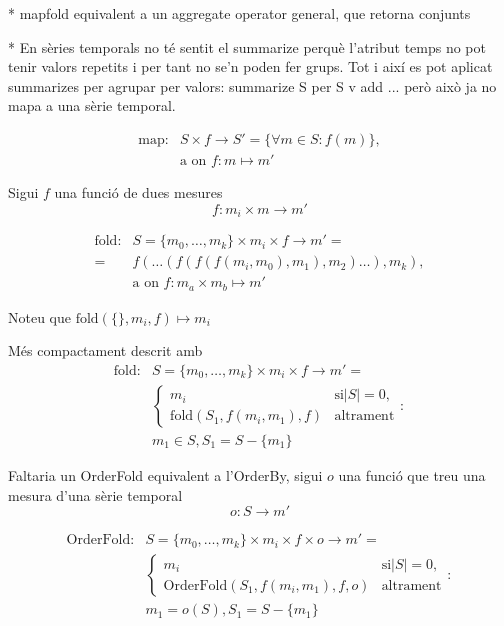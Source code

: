 * mapfold equivalent a un aggregate operator general, que retorna conjunts 

* En sèries temporals no té sentit el summarize perquè l'atribut temps no pot tenir valors repetits i per tant no se'n poden fer grups. Tot i així es pot aplicat summarizes per agrupar per valors: summarize S per S {v} add ...
però això ja no mapa a una sèrie temporal.




\begin{align*}
  \text{map}:& S \times f \longrightarrow S' = \{\forall m\in S : f(m) \}, \\
             & \text{a on } f: m \mapsto m' 
\end{align*}



Sigui $f$ una funció de dues mesures 
\[
f: m_i \times m \longrightarrow m' 
\]

\begin{align*}
  \text{fold}: & S=\{m_0,\dotsc,m_k\} \times m_i \times f \longrightarrow m'= \\
               =& f(\dots(f(f(f(m_i,m_0),m_1),m_2)\dots),m_k), \\
               & \text{a on } f: m_a \times m_b \mapsto m'
\end{align*}

Noteu que $\text{fold}(\{\},m_i,f) \mapsto m_i$ 

Més compactament descrit amb
\begin{align*}
  \text{fold}: & S=\{m_0,\dotsc,m_k\} \times m_i \times f \longrightarrow m'= \\
  & \begin{cases}
    m_i & \text{si} |S|=0, \\
    \text{fold}(S_1,f(m_i,m_1),f) & \text{altrament}
  \end{cases}:\\
  & m_1 \in S, S_1 = S - \{m_1\}
\end{align*}



Faltaria un OrderFold equivalent a l'OrderBy, sigui $o$ una funció que treu una mesura d'una sèrie temporal
\[
o: S \longrightarrow m'
\]


\begin{align*}
  \text{OrderFold}: & S=\{m_0,\dotsc,m_k\} \times m_i \times f \times o \longrightarrow m'= \\
  & \begin{cases}
    m_i & \text{si} |S|=0, \\
    \text{OrderFold}(S_1,f(m_i,m_1),f,o) & \text{altrament}
  \end{cases}:\\
  & m_1 = o(S), S_1 = S - \{m_1\}
\end{align*}

